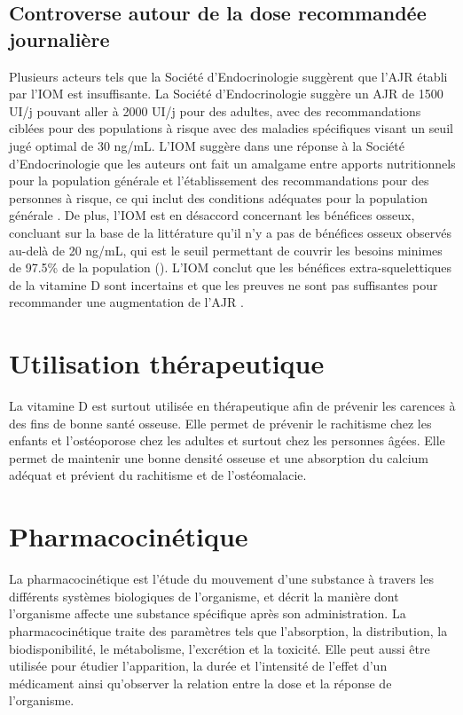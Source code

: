 \documentclass[
  a4paper,
  DIV=11,
  numbers=noendperiod,
  listof=totoc]{scrreprt}
\begin{document}
\subsection{Controverse autour de la dose recommandée
journalière}\label{controverse-autour-de-la-dose-recommanduxe9e-journaliuxe8re}

Plusieurs acteurs tels que la Société d'Endocrinologie suggèrent que
l'\ac{AJR} établi par l'\ac{IOM} est insuffisante. La Société
d'Endocrinologie suggère un \ac{AJR} de 1500 UI/j pouvant aller à 2000
UI/j pour des adultes, avec des recommandations ciblées pour des
populations à risque avec des maladies spécifiques visant un seuil jugé
optimal de 30 ng/mL. L'\ac{IOM} suggère dans une réponse à la Société
d'Endocrinologie que les auteurs ont fait un amalgame entre apports
nutritionnels pour la population générale et l'établissement des
recommandations pour des personnes à risque, ce qui inclut des
conditions adéquates pour la population générale
\autocite{Rosen.IOM.2012}. De plus, l'\ac{IOM} est en désaccord
concernant les bénéfices osseux, concluant sur la base de la littérature
qu'il n'y a pas de bénéfices osseux observés au-delà de 20 ng/mL, qui
est le seuil permettant de couvrir les besoins minimes de 97.5\% de la
population (). L'\ac{IOM} conclut que les bénéfices
extra-squelettiques de la vitamine D sont incertains et que les preuves
ne sont pas suffisantes pour recommander une augmentation de l'\ac{AJR}
\autocite{IOM.2011}.

\section{Utilisation thérapeutique}\label{utilisation-thuxe9rapeutique}

La vitamine D est surtout utilisée en thérapeutique afin de prévenir les
carences à des fins de bonne santé osseuse. Elle permet de prévenir le
rachitisme chez les enfants et l'ostéoporose chez les adultes et surtout
chez les personnes âgées. Elle permet de maintenir une bonne densité
osseuse et une absorption du calcium adéquat et prévient du rachitisme
et de l'ostéomalacie.

\section{Pharmacocinétique}\label{pharmacocinuxe9tique}

La pharmacocinétique est l'étude du mouvement d'une substance à travers
les différents systèmes biologiques de l'organisme, et décrit la manière
dont l'organisme affecte une substance spécifique après son
administration. La pharmacocinétique traite des paramètres tels que
l'absorption, la distribution, la biodisponibilité, le métabolisme,
l'excrétion et la toxicité. Elle peut aussi être utilisée pour étudier
l'apparition, la durée et l'intensité de l'effet d'un médicament ainsi
qu'observer la relation entre la dose et la réponse de l'organisme.
\end{document}
